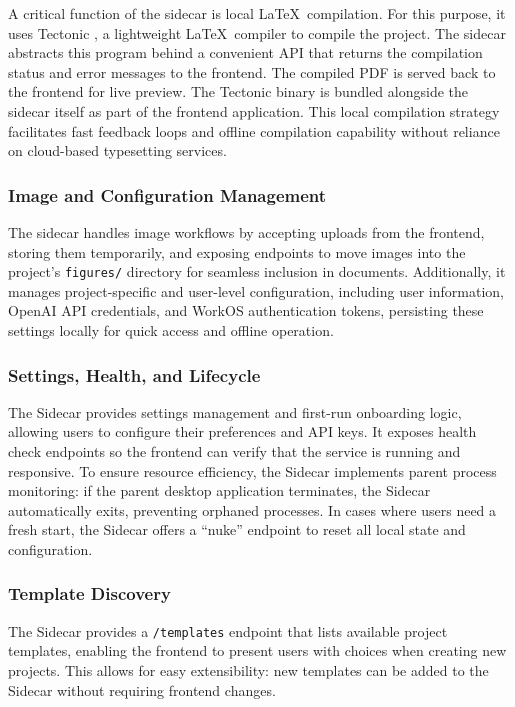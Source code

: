 A critical function of the sidecar is local \LaTeX\ compilation.
For this purpose, it uses Tectonic \cite{tectonic}, a lightweight \LaTeX\ compiler to compile the project.
The sidecar abstracts this program behind a convenient API that returns the compilation status and error messages to the frontend.
The compiled PDF is served back to the frontend for live preview.
The Tectonic binary is bundled alongside the sidecar itself as part of the frontend application.
This local compilation strategy facilitates fast feedback loops and offline compilation capability without reliance on cloud-based typesetting services.

\subsubsection{Image and Configuration Management}

The sidecar handles image workflows by accepting uploads from the frontend, storing them temporarily, and exposing endpoints to move images into the project's \texttt{figures/} directory for seamless inclusion in documents. Additionally, it manages project-specific and user-level configuration, including user information, OpenAI API credentials, and WorkOS authentication tokens, persisting these settings locally for quick access and offline operation.

\subsubsection{Settings, Health, and Lifecycle}

The Sidecar provides settings management and first-run onboarding logic, allowing users to configure their preferences and API keys. It exposes health check endpoints so the frontend can verify that the service is running and responsive. To ensure resource efficiency, the Sidecar implements parent process monitoring: if the parent desktop application terminates, the Sidecar automatically exits, preventing orphaned processes. In cases where users need a fresh start, the Sidecar offers a ``nuke'' endpoint to reset all local state and configuration.

\subsubsection{Template Discovery}

The Sidecar provides a \texttt{/templates} endpoint that lists available project templates, enabling the frontend to present users with choices when creating new projects. This allows for easy extensibility: new templates can be added to the Sidecar without requiring frontend changes.

